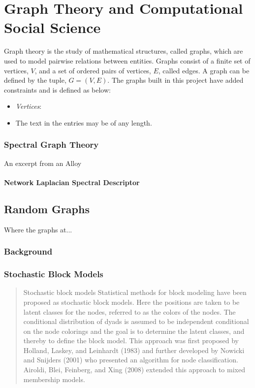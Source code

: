 \chapter{Graph Theory and Computational Social Science}\label{ch:GraphTheory}

Graph theory is the study of mathematical structures, called graphs, which are
used to model pairwise relations between entities. Graphs consist of a finite
set of vertices, $V$, and a set of ordered pairs of vertices, $E$, called edges.
A graph can be defined by the tuple, $G=(V,E)$. The graphs built in this project
have added constraints and is defined as below:

\begin{itemize}
    \item \emph{Vertices}:%
    \item The text in the entries may be of any length.
  \end{itemize}


\subsection{Spectral Graph Theory}\label{sec:spectralGraphTheory}

    An excerpt from an Alloy
    
\subsubsection{Network Laplacian Spectral Descriptor}\label{sec:NetLSD}

 
\section{Random Graphs}\label{sec:RandomGraphs}

    Where the graphs at...
    
\subsection{Background}\label{sec:RandomGraphBackground}

	
\subsection{Stochastic Block Models}\label{sec:SBM}

\begin{quote}
    Stochastic block models
    Statistical methods for block modeling have been proposed as stochastic
    block models. Here the positions are taken to be latent classes for the nodes,
    referred to as the colors of the nodes. The conditional distribution of dyads is
    assumed to be independent conditional on the node colorings and the goal is to
    determine the latent classes, and thereby to define the block model. This
    approach was first proposed by Holland, Laskey, and Leinhardt (1983) and further
    developed by Nowicki and Snijders (2001) who presented an algorithm for node
    classification. Airoldi, Blei, Feinberg, and Xing (2008) extended this approach
    to mixed membership models. \cite{robins2013tutorial}
\end{quote}
    

